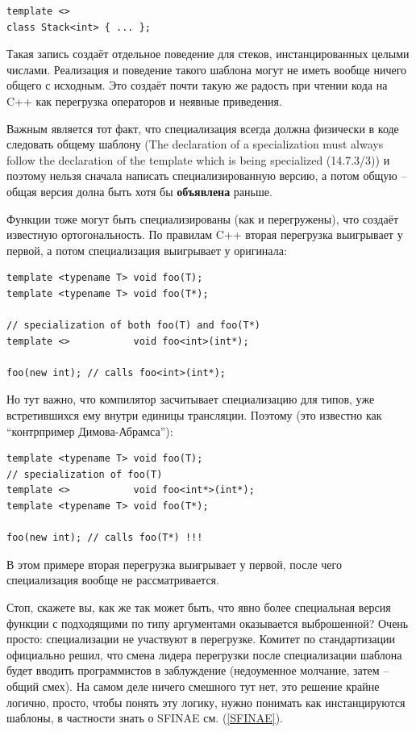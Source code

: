 \documentclass[a4paper,12pt,oneside]{article}
\begin{document}
\begin{lstlisting}
template <>
class Stack<int> { ... };
\end{lstlisting}

Такая запись создаёт отдельное поведение для стеков, инстанцированных целыми числами. Реализация и поведение такого шаблона могут не иметь вообще ничего общего с исходным. Это создаёт почти такую же радость при чтении кода на C++ как перегрузка операторов и неявные приведения.

Важным является тот факт, что специализация всегда должна физически в коде следовать общему шаблону (The declaration of a specialization must always follow the declaration of the template which is being specialized (14.7.3/3)) и поэтому нельзя сначала написать специализированную версию, а потом общую -- общая версия долна быть хотя бы \textbf{объявлена} раньше.

Функции тоже могут быть специализированы (как и перегружены), что создаёт известную ортогональность. По правилам C++ вторая перегрузка выигрывает у первой, а потом специализация выигрывает у оригинала:

\begin{lstlisting}
template <typename T> void foo(T);
template <typename T> void foo(T*); 

// specialization of both foo(T) and foo(T*)
template <>           void foo<int>(int*); 

foo(new int); // calls foo<int>(int*);
\end{lstlisting}

Но тут важно, что компилятор засчитывает специализацию для типов, уже встретившихся ему внутри единицы трансляции. Поэтому (это известно как ``контрпример Димова-Абрамса''):

\begin{lstlisting}
template <typename T> void foo(T);
// specialization of foo(T)
template <>           void foo<int*>(int*); 
template <typename T> void foo(T*);

foo(new int); // calls foo(T*) !!!
\end{lstlisting}

В этом примере вторая перегрузка выигрывает у первой, после чего специализация вообще не рассматривается.

Стоп, скажете вы, как же так может быть, что явно более специальная версия функции с подходящими по типу аргументами оказывается выброшенной? Очень просто: специализации не участвуют в перегрузке. Комитет по стандартизации официально решил, что смена лидера перегрузки после специализации шаблона будет вводить программистов в заблуждение (недоуменное молчание, затем -- общий смех). На самом деле ничего смешного тут нет, это решение крайне логично, просто, чтобы понять эту логику, нужно понимать как инстанцируются шаблоны, в частности знать о SFINAE см. (\ref{SFINAE}).
\end{document}
